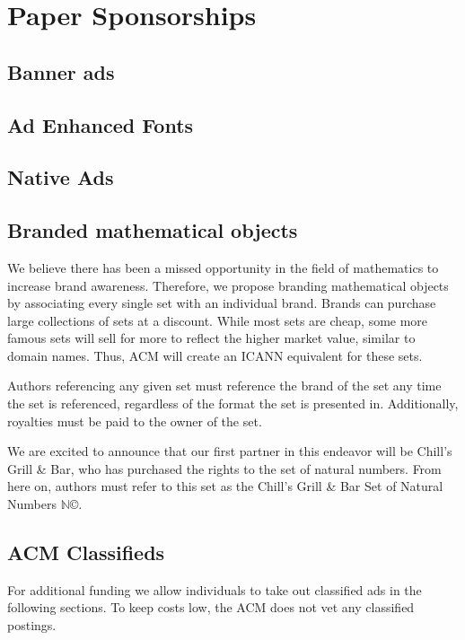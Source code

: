 \section{Paper Sponsorships}

\subsection{Banner ads}

\subsection{Ad Enhanced Fonts}

\subsection{Native Ads}

\subsection{Branded mathematical objects}
We believe there has been a missed opportunity in the field of mathematics to
increase brand awareness.
Therefore, we propose branding mathematical objects by associating every single
set with an individual brand.
Brands can purchase large collections of sets at a discount.
While most sets are cheap, some more famous sets will sell for more to reflect
the higher market value, similar to domain names.
Thus, ACM will create an ICANN equivalent for these sets.

Authors referencing any given set must reference the brand of the set any time
the set is referenced, regardless of the format the set is presented  in.
Additionally, royalties must be paid to the owner of the set.

We are excited to announce that our first partner in this endeavor will be
Chill's Grill \& Bar, who has purchased the rights to the set of natural
numbers.
From here on, authors must refer to this set as the Chill's Grill \& Bar Set of
Natural Numbers \(\mathbb{N}\)\copyright.

\subsection{ACM Classifieds}
For additional funding we allow individuals to take out classified ads in the
following sections.
To keep costs low, the ACM does not vet any classified postings.

